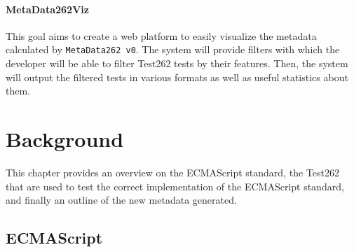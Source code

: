 \documentclass[runningheads]{llncs}
\begin{document}
\paragraph{MetaData262Viz}
This goal aims to create a web platform to easily visualize the metadata calculated by \texttt{MetaData262 v0}. The system will provide filters with which the developer will be able to filter Test262 tests by their features. Then, the system will output the filtered tests in various formats as well as useful statistics about them.


\section{Background}
\label{sec:Background}
This chapter provides an overview on the ECMAScript standard, the Test262 that are used to test the correct implementation of the ECMAScript standard, and finally an outline of the new metadata generated.

\subsection{ECMAScript}
\label{subsec:ECMAScript}
\end{document}
